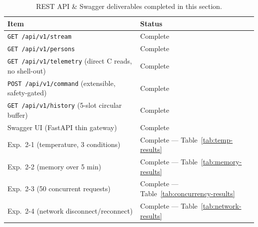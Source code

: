 
\begin{table}[H]
\centering
\caption{REST API \& Swagger deliverables completed in this section.}
\label{tab:api-summary}
\begin{tabular}{ll}
\toprule
\textbf{Item} & \textbf{Status} \\
\midrule
\texttt{GET /api/v1/stream} & Complete \\
\texttt{GET /api/v1/persons} & Complete \\
\texttt{GET /api/v1/telemetry} (direct C reads, no shell-out) & Complete \\
\texttt{POST /api/v1/command} (extensible, safety-gated) & Complete \\
\texttt{GET /api/v1/history} (5-slot circular buffer) & Complete \\
Swagger UI (FastAPI thin gateway) & Complete \\
Exp.\ 2-1 (temperature, 3 conditions) & Complete --- Table~\ref{tab:temp-results} \\
Exp.\ 2-2 (memory over 5 min) & Complete --- Table~\ref{tab:memory-results} \\
Exp.\ 2-3 (50 concurrent requests) & Complete --- Table~\ref{tab:concurrency-results} \\
Exp.\ 2-4 (network disconnect/reconnect) & Complete --- Table~\ref{tab:network-results} \\
\bottomrule
\end{tabular}
\end{table}
